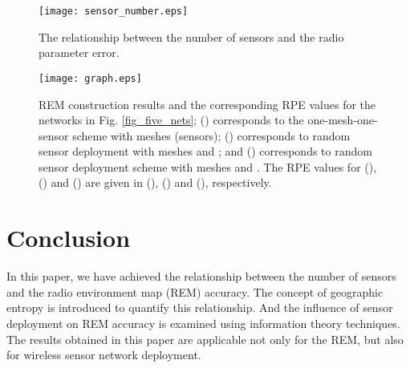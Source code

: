 \documentclass[conference]{IEEEtran}
\begin{document}
\begin{figure}[!t]
\centering
\texttt{[image: sensor\_number.eps]}
\caption{The relationship between the number of sensors and the radio parameter error.}
\label{fig_sensor_number}
\end{figure}

\begin{figure}
\centering
\texttt{[image: graph.eps]}
\caption{REM construction results and the corresponding RPE values for the networks in Fig. \ref{fig_five_nets};
() corresponds to the one-mesh-one-sensor scheme with  meshes (sensors);
() corresponds to random sensor deployment with  meshes and ;
and () corresponds to random sensor deployment scheme with  meshes and .
The RPE values for (), () and () are given in (), () and (), respectively.} \label{fig_picture_REM_construction}
\end{figure}

\section{Conclusion}

In this paper, we have achieved the relationship between the number of sensors and the radio environment map (REM) accuracy.
The concept of geographic entropy is introduced to quantify this relationship.
And the influence of sensor deployment on REM accuracy is examined using information theory techniques.
The results obtained in this paper are applicable not only for the REM, but also for wireless sensor network deployment.
\end{document}
